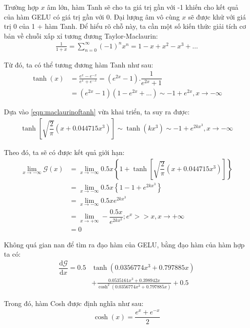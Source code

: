 Trường hợp $x$ âm lớn, hàm Tanh sẽ cho ta giá trị gần với -1 khiến cho kết quả của hàm GELU có giá trị gần với 0.
Đại lượng âm vô cùng $x$ sẽ được khử với giá trị 0 của 1 + hàm Tanh.
Để hiểu rõ chỗ này, ta cần một số kiến thức giải tích cơ bản về chuỗi xấp xỉ tương đương Taylor-Maclaurin:
\begin{align}
    \frac{1}{1+x} = \sum_{n=0}^{\infty}(-1)^nx^n = 1 - x + x^2 - x^3 + \dots
\end{align}

Từ đó, ta có thể tương đương hàm Tanh như sau:
\begin{align}
    \tanh(x) &= \frac{e^x - e^{-x}}{e^x + e^{-x}} = \left(e^{2x} - 1\right).\dfrac{1}{e^{2x} + 1}\nonumber\\
    &= \left(e^{2x} - 1\right)\left(1 - e^{2x} + \dots\right) \sim -1 + e^{2x}, x \rightarrow -\infty \label{eqn:maclaurinoftanh}
\end{align}

Dựa vào \ref{eqn:maclaurinoftanh} vừa khai triển, ta suy ra được:
\begin{align}
    \tanh\left[\sqrt{\dfrac{2}{\pi}}\left(x + 0.044715x^3\right)\right] \sim \tanh\left(kx^3\right) \sim -1 + e^{2kx^3}, x \rightarrow -\infty
\end{align}

Theo đó, ta sẽ có được kết quả giới hạn:
\begin{align}
    \lim_{x \rightarrow -\infty}\mathcal{G}(x) &= \lim_{x \rightarrow -\infty}0.5x\left\{1 + \tanh\left[\sqrt{\dfrac{2}{\pi}}\left(x + 0.044715x^3\right)\right]\right\} \nonumber\\
    &= \lim_{x \rightarrow -\infty}0.5x\left\{1 - 1 + e^{2kx^3}\right\} \nonumber\\
    &= \lim_{x \rightarrow -\infty}0.5xe^{2kx^3} \nonumber\\
    &= \lim_{x \rightarrow +\infty}-\dfrac{0.5x}{e^{2kx^3}}; e^{x} >> x, x \rightarrow +\infty \nonumber\\
    &= 0
\end{align}

Không quá gian nan để tìm ra đạo hàm của GELU, bằng đạo hàm của hàm hợp ta có:
\begin{align}
     \dfrac{\text{d}\mathcal{G}}{\text{d}x} = 0.5&\tanh\left(0.0356774x^3 + 0.797885x\right) \nonumber\\
     &+ \frac{0.0535161x^3+ 0.398942x}{\cosh^2\left(0.0356774x^3 + 0.797885x\right)} + 0.5
\end{align}

Trong đó, hàm Cosh được định nghĩa như sau:
\begin{align}
    \cosh(x) = \dfrac{e^x + e^{-x}}{2}    
\end{align}

